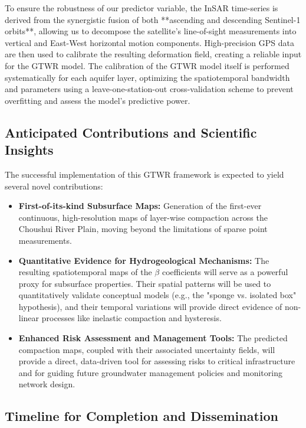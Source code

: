 \documentclass[12pt, a4paper]{article}
\begin{document}
To ensure the robustness of our predictor variable, the InSAR time-series is derived from the synergistic fusion of both **ascending and descending Sentinel-1 orbits**, allowing us to decompose the satellite's line-of-sight measurements into vertical and East-West horizontal motion components. High-precision GPS data are then used to calibrate the resulting deformation field, creating a reliable input for the GTWR model. The calibration of the GTWR model itself is performed systematically for each aquifer layer, optimizing the spatiotemporal bandwidth and parameters using a leave-one-station-out cross-validation scheme to prevent overfitting and assess the model's predictive power.

\subsection{Anticipated Contributions and Scientific Insights}
%
%
The successful implementation of this GTWR framework is expected to yield several novel contributions:
%
\begin{itemize}
	\item \textbf{First-of-its-kind Subsurface Maps:} Generation of the first-ever continuous, high-resolution maps of layer-wise compaction across the Choushui River Plain, moving beyond the limitations of sparse point measurements.
	
	\item \textbf{Quantitative Evidence for Hydrogeological Mechanisms:} The resulting spatiotemporal maps of the $\beta$ coefficients will serve as a powerful proxy for subsurface properties. Their spatial patterns will be used to quantitatively validate conceptual models (e.g., the "sponge vs. isolated box" hypothesis), and their temporal variations will provide direct evidence of non-linear processes like inelastic compaction and hysteresis.
	
	\item \textbf{Enhanced Risk Assessment and Management Tools:} The predicted compaction maps, coupled with their associated uncertainty fields, will provide a direct, data-driven tool for assessing risks to critical infrastructure and for guiding future groundwater management policies and monitoring network design.
\end{itemize}
	
	\subsection{Timeline for Completion and Dissemination}
	
\end{document}
